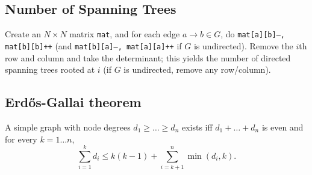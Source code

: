 	\subsection{Number of Spanning Trees}
		Create an $N\times N$ matrix \texttt{mat}, and for each edge $a \rightarrow b \in G$, do
		\texttt{mat[a][b]--, mat[b][b]++} (and \texttt{mat[b][a]--, mat[a][a]++} if $G$ is undirected).
		Remove the $i$th row and column and take the determinant; this yields the number of directed spanning trees rooted at $i$
		(if $G$ is undirected, remove any row/column).

	\subsection{Erdős-Gallai theorem}
		A simple graph with node degrees $d_1 \ge \dots \ge d_n$ exists iff $d_1 + \dots + d_n$ is even and for every $k = 1\dots n$,
		\[ \sum _{i=1}^{k}d_{i}\leq k(k-1)+\sum _{i=k+1}^{n}\min(d_{i},k). \]
